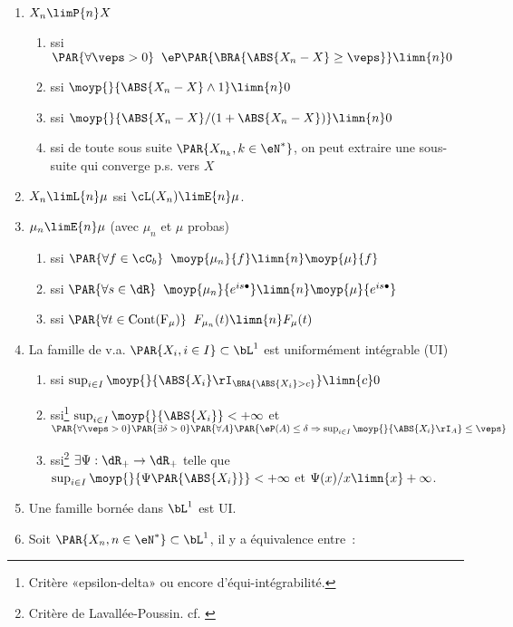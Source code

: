 \begin{enumerate}
\item $X_n\limP{n}X$
  \begin{enumerate}
  \item ssi $\PAR{\forall\veps>0}\;\;\eP\PAR{\BRA{\ABS{X_n-X}\geq\veps}}\limn{n}0$
  \item ssi $\moyp{}{\ABS{X_n-X}\land 1}\limn{n}0$
  \item ssi $\moyp{}{\ABS{X_n-X}/(1+\ABS{X_n-X})}\limn{n}0$
  \item ssi de toute sous suite $\PAR{X_{n_k},k\in\eN^*}$, on peut
    extraire une sous-suite qui converge p.s. vers $X$
  \end{enumerate}
\item $X_n\limL{n}\mu$ \quad ssi \quad $\cL(X_n)\limE{n}\mu$.
\item $\mu_n\limE{n}\mu$ \quad (avec $\mu_n$ et $\mu$ probas)
  \begin{enumerate}
  \item ssi $\PAR{\forall f\in\cC_b}\;\; \moyp{\mu_n}{f}\limn{n}\moyp{\mu}{f}$
  \item ssi $\PAR{\forall s\in\dR}\;\; 
    \moyp{\mu_n}{e^{is\bullet}}\limn{n}\moyp{\mu}{e^{is\bullet}}$
  \item ssi $\PAR{\forall t\in\mathrm{Cont(F_\mu)}}\;\; F_{\mu_n}(t)\limn{n}F_\mu(t)$
  \end{enumerate}
\item La famille de v.a. $\PAR{X_i,i\in I}\subset\bL^1$ est uniformément intégrable (UI)
  \begin{enumerate}
  \item ssi $\sup_{i{\in}I}\moyp{}{\ABS{X_i}\rI_{\BRA{\ABS{X_i}>c}}}\limn{c}0$
  \item ssi\footnote{Critère «epsilon-delta» ou encore d'équi-intégrabilité.}
    $\sup_{i\in{I}}\moyp{}{\ABS{X_i}}<+\infty$ et $\PAR{\forall\veps>0}\PAR{\exists\delta>0}\PAR{\forall
      A}
    \PAR{\eP(A)\leq \delta \Rightarrow \sup_{i\in I}\moyp{}{\ABS{X_i}\rI_A}\leq\veps}$
  \item ssi\footnote{Critère de Lavallée-Poussin. cf. \cite[p. 10]{borkar}} $\exists
    \Psi:\dR_+\to\dR_+$ telle que $\sup_{i\in{I}}\moyp{}{\Psi\PAR{\ABS{X_i}}}<+\infty$ et
    $\Psi(x)/x\limn{x}+\infty$.
  \end{enumerate}
\item Une famille bornée dans $\bL^1$ est UI.
\item Soit $\PAR{X_n,n\in\eN^*}\subset\bL^1$, il y a équivalence entre~:
  \begin{enumerate}

\end{enumerate}
\end{enumerate}
